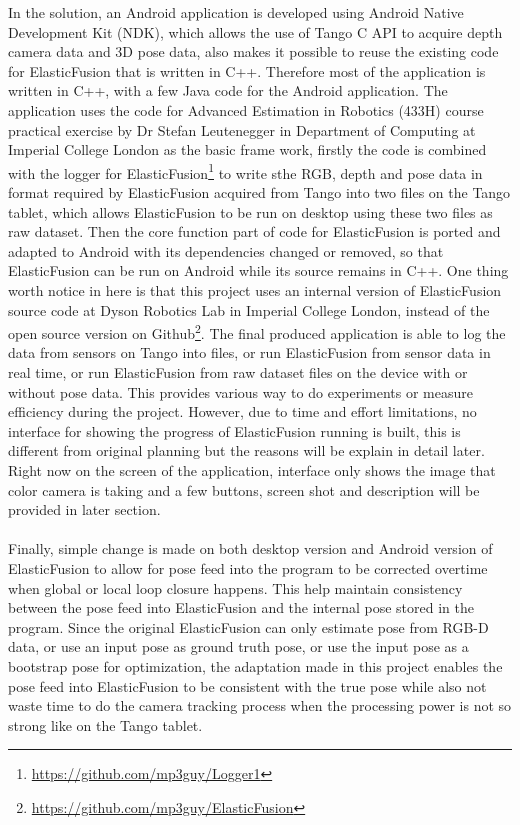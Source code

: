 \documentclass[12pt,twoside]{article}
\begin{document}
In the solution, an Android application is developed using Android Native Development Kit (NDK), which allows the use of Tango C API to acquire depth camera data and 3D pose data, also makes it possible to reuse the existing code for ElasticFusion that is written in C++. Therefore most of the application is written in C++, with a few Java code for the Android application. The application uses the code for Advanced Estimation in Robotics (433H) course practical exercise by Dr Stefan Leutenegger in Department of Computing at Imperial College London as the basic frame work, firstly the code is combined with the logger for ElasticFusion\footnote{\url{https://github.com/mp3guy/Logger1}} to write sthe RGB, depth and pose data in format required by ElasticFusion acquired from Tango into two files on the Tango tablet, which allows ElasticFusion to be run on desktop using these two files as raw dataset. Then the core function part of code for ElasticFusion is ported and adapted to Android with its dependencies changed or removed, so that ElasticFusion can be run on Android while its source remains in C++. One thing worth notice in here is that this project uses an internal version of ElasticFusion source code at Dyson Robotics Lab in Imperial College London, instead of the open source version on Github\footnote{\url{https://github.com/mp3guy/ElasticFusion}}. The final produced application is able to log the data from sensors on Tango into files, or run ElasticFusion from sensor data in real time, or run ElasticFusion from raw dataset files on the device with or without pose data. This provides various way to do experiments or measure  efficiency during the project. However, due to time and effort limitations, no interface for showing the progress of ElasticFusion running is built, this is different from original planning but the reasons will be explain in detail later. Right now on the screen of the application, interface only shows the image that color camera is taking and a few buttons, screen shot and description will be provided in later section.\\
\\
Finally, simple change is made on both desktop version and Android version of ElasticFusion to allow for pose feed into the program to be corrected overtime when global or local loop closure happens. This help maintain consistency between the pose feed into ElasticFusion and the internal pose stored in the program. Since the original ElasticFusion can only estimate pose from RGB-D data, or use an input pose as ground truth pose, or use the input pose as a bootstrap pose for optimization, the adaptation made in this project enables the pose feed into ElasticFusion to be consistent with the true pose while also not waste time to do the camera tracking process when the processing power is not so strong like on the Tango tablet.
\end{document}
